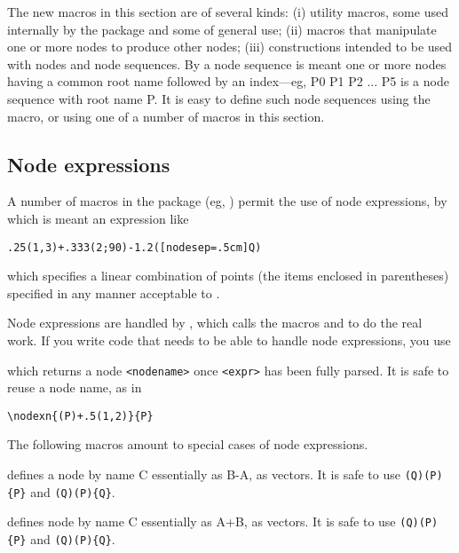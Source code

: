 \documentclass[11pt,english,BCOR10mm,DIV12,bibliography=totoc,parskip=false,smallheadings
    headexclude,footexclude,oneside]{pst-doc}
\begin{document}
The new macros in this section
are of several kinds: (i) utility macros, some used 
internally by the package and some of general use; (ii) macros that manipulate one or 
more nodes to produce other nodes; (iii) constructions intended to be used with nodes and 
node sequences. By a node sequence is meant one or more nodes having a common root name 
followed by an index---eg, P0 P1 P2 ... P5 is a node sequence with root name P. It is 
easy to define such node sequences using the  macro, or using one of a 
number of macros in this section.

\subsection{Node expressions}
A number of macros in the package (eg, ) permit the use of node expressions, 
by which is meant an expression like
\begin{verbatim}
.25(1,3)+.333(2;90)-1.2([nodesep=.5cm]Q)
\end{verbatim}
which specifies a linear combination of points (the items enclosed in parentheses) 
specified in any manner acceptable to . 

Node expressions are handled by , which calls the macros  and 
 to do the real work. If you write code that needs to be able to handle node expressions, you use

\begin{BDef}
\end{BDef}

which returns a node \verb|<nodename>| once \verb|<expr>| has been fully parsed. It is safe to 
reuse a node name, as in 
\begin{verbatim}
\nodexn{(P)+.5(1,2)}{P}
\end{verbatim}

The following macros amount to special cases of node expressions.
\begin{BDef}
\end{BDef}
 defines a node by name C essentially as B-A, as vectors. It is safe to use 
 \verb|(Q)(P){P}| and \verb|(Q)(P){Q}|.

\begin{BDef}
\end{BDef}
 defines node by name C essentially as A+B, as vectors. It is safe to use 
 \verb|(Q)(P){P}| and \verb|(Q)(P){Q}|.
\end{document}
